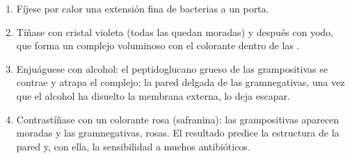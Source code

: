 \begin{method}\label{met:b1:cell-unit-of-life:gram}
\begin{enumerate}
  \item Fíjese por calor una extensión fina de bacterias a un porta.
  \item Tíñase con cristal violeta (todas las  quedan moradas) y
        después con yodo, que forma un complejo voluminoso con el
        colorante dentro de las .
  \item Enjuáguese con alcohol: el peptidoglucano grueso de las 
        grampositivas se contrae y atrapa el complejo; la pared delgada de
        las gramnegativas, una vez que el alcohol ha disuelto la membrana
        externa, lo deja escapar.
  \item Contrastíñase con un colorante rosa (safranina): las 
        grampositivas aparecen moradas y las gramnegativas, rosas. El
        resultado predice la estructura de la pared y, con ella, la
        sensibilidad a muchos antibióticos.
\end{enumerate}
\end{method}

